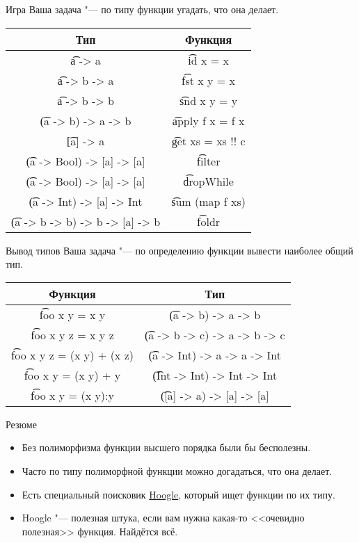 \begin{frame}{Игра}
	Ваша задача "--- по типу функции угадать, что она делает.
	\begin{tabular}{c|c}
		\centering
		Тип & Функция \\\hline
		\t{a -> a} & \pause\t{id x = x} \\\pause
		\t{a -> b -> a} & \pause\t{fst x y = x} \\\pause
		\t{a -> b -> b} & \pause\t{snd x y = y} \\\pause
		\t{(a -> b) -> a -> b} & \pause\t{apply f x = f x} \\\pause
		\t{[a] -> a} & \pause\t{get xs = xs !! c} \\\pause
		\t{(a -> Bool) -> [a] -> [a]} & \pause\t{filter} \\\pause
		\t{(a -> Bool) -> [a] -> [a]} & \pause\t{dropWhile} \\\pause
		\t{(a -> Int) -> [a] -> Int} & \pause\t{sum (map f xs)} \\\pause
		\t{(a -> b -> b) -> b -> [a] -> b} & \pause\t{foldr}
	\end{tabular}
\end{frame}

\begin{frame}{Вывод типов}
	Ваша задача "--- по определению функции вывести наиболее общий тип.
	\begin{tabular}{c|c}
		\centering
		Функция & Тип \\\hline
		\t{foo x y = x y} & \pause \t{(a -> b) -> a -> b} \\\pause
		\t{foo x y z = x y z} & \pause \t{(a -> b -> c) -> a -> b -> c} \\\pause
		\t{foo x y z = (x y) + (x z)} & \pause \t{(a -> Int) -> a -> a -> Int} \\\pause
		\t{foo x y = (x y) + y} & \pause \t{(Int -> Int) -> Int -> Int} \\\pause
		\t{foo x y = (x y):y} & \pause \t{([a] -> a) -> [a] -> [a]} \\
	\end{tabular}
\end{frame}

\begin{frame}{Резюме}
	\begin{itemize}
		\item Без полиморфизма функции высшего порядка были бы бесполезны.
		\item Часто по типу полиморфной функции можно догадаться, что она делает.
		\item Есть специальный поисковик \href{https://www.haskell.org/hoogle/}{Hoogle}, который ищет функции по их типу.
		\item Hoogle "--- полезная штука, если вам нужна какая-то <<очевидно полезная>> функция. Найдётся всё.
	\end{itemize}
\end{frame}
